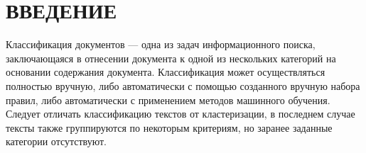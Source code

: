 \documentclass[14pt,a4paper]{extreport}
\begin{document}
	\renewcommand\contentsname{\center\normalsize \textbf{СОДЕРЖАНИЕ} \endcenter}
	\tableofcontents
	\endcenter
    \justifying
	\newpage
	\section*{\center\normalsize ВВЕДЕНИЕ \endcenter}
	\par Классификация документов — одна из задач информационного поиска, заключающаяся в отнесении документа к одной из нескольких категорий на основании содержания документа. Классификация может осуществляться полностью вручную, либо автоматически с помощью созданного вручную набора правил, либо автоматически с применением методов машинного обучения. Следует отличать классификацию текстов от кластеризации, в последнем случае тексты также группируются по некоторым критериям, но заранее заданные категории отсутствуют.
\end{document}
